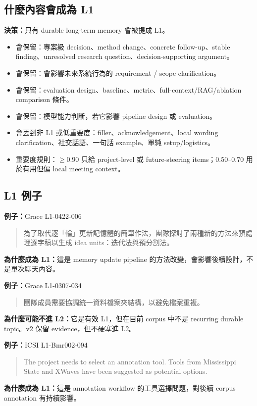 \documentclass[11pt]{article}
\newcommand{\decision}[1]{\textbf{決策：}#1}
\newcommand{\example}[1]{\textbf{例子：}#1}
\newcommand{\smallgap}{\vspace{0.35em}}
\begin{document}
\subsection{什麼內容會成為 L1}

\decision{只有 durable long-term memory 會被提成 L1。}

\begin{itemize}
  \item 會保留：專案級 decision、method change、concrete follow-up、stable finding、unresolved research question、decision-supporting argument。
  \item 會保留：會影響未來系統行為的 requirement / scope clarification。
  \item 會保留：evaluation design、baseline、metric、full-context/RAG/ablation comparison 條件。
  \item 會保留：模型能力判斷，若它影響 pipeline design 或 evaluation。
  \item 會丟到非 L1 或低重要度：filler、acknowledgement、local wording clarification、社交話語、一句話 example、單純 setup/logistics。
  \item 重要度規則：\(\geq 0.90\) 只給 project-level 或 future-steering items；\(0.50\)--\(0.70\) 用於有用但偏 local meeting context。
\end{itemize}

\subsection{L1 例子}

\example{Grace L1-0422-006}
\begin{quote}
為了取代逐「輪」更新記憶體的簡單作法，團隊探討了兩種新的方法來預處理逐字稿以生成 idea units：迭代法與預分割法。
\end{quote}
\textbf{為什麼成為 L1：}這是 memory update pipeline 的方法改變，會影響後續設計，不是單次聊天內容。

\smallgap
\example{Grace L1-0307-034}
\begin{quote}
團隊成員需要協調統一資料檔案夾結構，以避免檔案重複。
\end{quote}
\textbf{為什麼可能不進 L2：}它是有效 L1，但在目前 corpus 中不是 recurring durable topic。v2 保留 evidence，但不硬塞進 L2。

\smallgap
\example{ICSI L1-Bmr002-094}
\begin{quote}
The project needs to select an annotation tool. Tools from Mississippi State and XWaves have been suggested as potential options.
\end{quote}
\textbf{為什麼成為 L1：}這是 annotation workflow 的工具選擇問題，對後續 corpus annotation 有持續影響。
\end{document}
